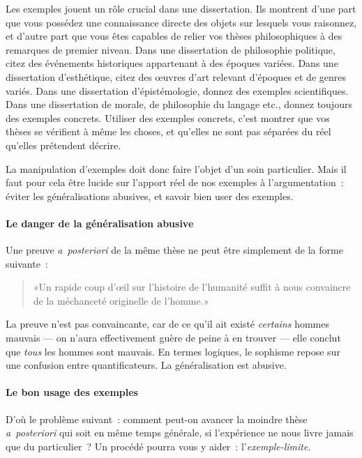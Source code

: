 \documentclass[a4paper,11pt]{article}
\newcommand{\apost}{\emph{a~posteriori}}
\begin{document}
Les exemples jouent un rôle crucial dans une dissertation. Ils montrent
d'une part que vous possédez une connaissance directe des objets sur
lesquels vous raisonnez, et d'autre part que vous êtes capables de
relier vos thèses philosophiques à des remarques de premier niveau. Dans
une dissertation de philosophie politique, citez des événements
historiques appartenant à des époques variées. Dans une dissertation
d'esthétique, citez des œuvres d'art relevant d'époques et de genres
variés. Dans une dissertation d'épistémologie, donnez des exemples
scientifiques. Dans une dissertation de morale, de philosophie du
langage etc., donnez toujours des exemples concrets. Utiliser des
exemples concrets, c'est montrer que vos thèses se vérifient à même les
choses, et qu'elles ne sont pas séparées du réel qu'elles prétendent
décrire.

\par

La manipulation d'exemples doit donc faire l'objet d'un soin
particulier. Mais il faut pour cela être lucide sur l'apport réel de nos
exemples à l'argumentation~: éviter les généralisations abusives, et
savoir bien user des exemples.

\paragraph{Le danger de la généralisation abusive}

Une preuve \apost{} de la même thèse ne peut être simplement de la forme
suivante~: 
\begin{quote}
  «Un rapide coup d'œil sur l'histoire de l'humanité suffit à nous
  convaincre de la méchanceté originelle de l'homme.»
\end{quote}
La preuve n'est pas convaincante, car de ce qu'il ait existé
\emph{certains} hommes mauvais --- on n'aura effectivement guère de
peine à en trouver --- elle conclut que \emph{tous} les hommes sont
mauvais. En termes logiques, le sophisme repose sur une confusion entre
quantificateurs. La généralisation est abusive.

\par


\paragraph{Le bon usage des exemples}

D'où le problème suivant~: comment peut-on avancer la moindre thèse
\apost{} qui soit en même temps générale, si l'expérience ne nous livre
jamais que du particulier~? Un procédé pourra vous y aider~:
l'\emph{exemple-limite}.
\end{document}
